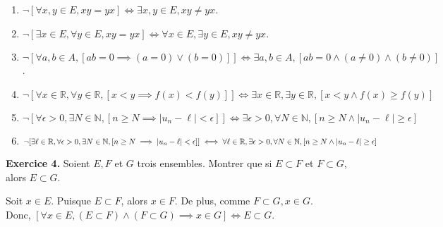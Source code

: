\documentclass[a4paper, 10pt]{report}
\providecommand{\abs}[1]{\lvert#1\rvert}
\begin{document}
	\colorbox{solution}
	{
		\begin{minipage}{0.9\textwidth}
			\begin{enumerate}[label=(\roman*)]
				\item $\neg[
				\forall x,y \in E,
				xy = yx
				]
				\iff
				\exists x,y \in E,
				xy \neq yx$.
				\item $\neg[
				\exists x \in E,
				\forall y \in E,
				xy = yx
				]
				\iff
				\forall x \in E,
				\exists y \in E,
				xy \neq yx
				$.
				\item $\neg[
				\forall a,b \in A,
				[ab = 0 \implies (a = 0) \lor (b = 0)]
				]
				\iff
				\exists a,b \in A,
				[ab = 0 \land (a \neq 0) \land (b \neq 0)]
				$.
				\item $\neg[
				\forall x \in \mathbb{R},
				\forall y \in \mathbb{R},
				[x < y \implies f(x) < f(y)]
				]
				\iff
				\exists x \in \mathbb{R},
				\exists y \in \mathbb{R},
				[x < y \land f(x) \geq f(y)]
				$
				\item $\neg[
				\forall \epsilon > 0,
				\exists N \in \mathbb{N},
				[n \geq N \implies \abs{u_n - \ell} < \epsilon]
				]
				\iff
				\exists \epsilon > 0,
				\forall N \in \mathbb{N},
				[n \geq N \land \abs{u_n - \ell} \geq \epsilon]
				$
				\item $\neg[
				\exists \ell \in \mathbb{R},
				\forall \epsilon > 0,
				\exists N \in \mathbb{N},
				[n \geq N \implies \abs{u_n - \ell} < \epsilon]
				]\\
				\iff
				\forall \ell \in \mathbb{R},
				\exists \epsilon > 0,
				\forall N \in \mathbb{N},
				[n \geq N \land \abs{u_n - \ell} \geq \epsilon]
				$
			\end{enumerate}
		\end{minipage}
	}
		
	\vspace{5mm}
	\noindent
	\textbf{Exercice 4.} Soient $E, F$ et $G$ trois ensembles. Montrer
	que	si $E \subset F$ et $F \subset G$, alors $E \subset G$.
	
	\colorbox{solution}
	{
		\begin{minipage}{0.9\textwidth}
			Soit $x \in E$. Puisque $E \subset F$, alors $x \in F$.
			De plus, comme $F \subset G, x \in G$.\\
			Donc, $[\forall x \in E, 
			(E \subset F) \land (F \subset G)
			\implies
			x \in G]
			\iff
			E \subset G$.
		\end{minipage}
	}
		
	\newpage
	
\end{document}
